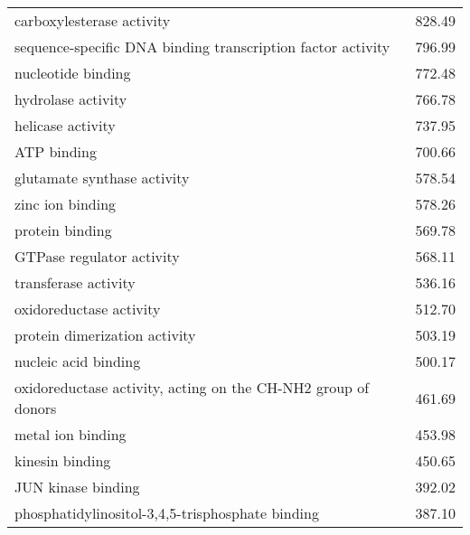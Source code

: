 \begin{table}[hp]
\begin{center}
\begin{tabular}{p{}r}
carboxylesterase activity                                     & 828.49                      \\
sequence-specific DNA binding transcription factor activity   & 796.99                      \\ %
nucleotide binding                                            & 772.48                      \\ %
hydrolase activity                                            & 766.78                      \\
helicase activity                                             & 737.95                      \\ %
ATP binding                                                   & 700.66                      \\
glutamate synthase activity                                   & 578.54                      \\
zinc ion binding                                              & 578.26                      \\ %
protein binding                                               & 569.78                      \\
GTPase regulator activity                                     & 568.11                      \\
transferase activity                                          & 536.16                      \\
oxidoreductase activity                                       & 512.70                      \\
protein dimerization activity                                 & 503.19                      \\
nucleic acid binding                                          & 500.17                      \\
oxidoreductase activity, acting on the CH-NH2 group of donors & 461.69                      \\
metal ion binding                                             & 453.98                      \\
kinesin binding                                               & 450.65                      \\
JUN kinase binding                                            & 392.02                      \\ %
phosphatidylinositol-3,4,5-trisphosphate binding              & 387.10                      \\

\end{tabular}
\end{center}
\end{table}
